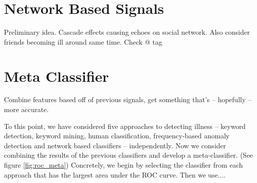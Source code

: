 \documentclass{acm_proc_article-sp}
\begin{document}
\section{Network Based Signals}

Preliminary idea. Cascade effects causing echoes on social network. Also consider friends becoming ill around same time. Check @ tag

\section{Meta Classifier}

Combine features based off of previous signals, get something that's -- hopefully -- more accurate.

To this point, we have considered five approaches to detecting illness -- keyword detection, keyword mining, human classification, frequency-based anomaly detection and network based classifiers -- independently. Now we consider combining the results of the previous classifiers and develop a meta-classifier. (See figure \ref{fig:roc_meta}) Concretely, we begin by selecting the classifier from each approach that has the largest area under the ROC curve. Then we use....
\end{document}

